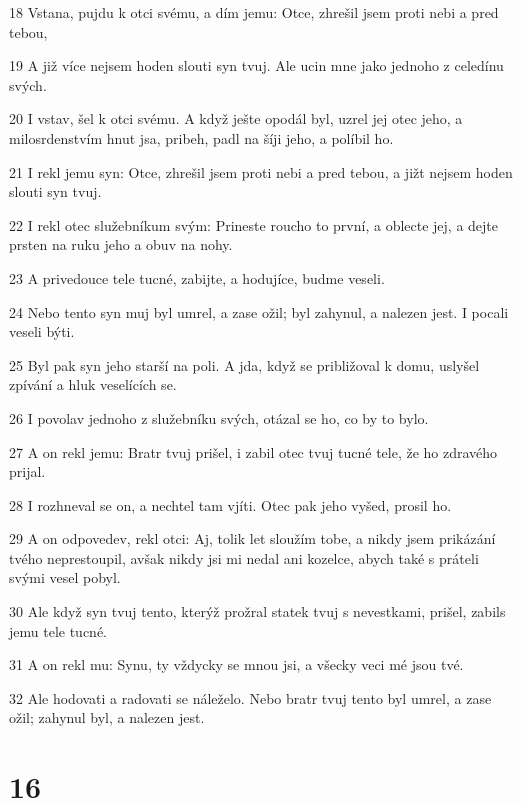 \par 18 Vstana, pujdu k otci svému, a dím jemu: Otce, zhrešil jsem proti nebi a pred tebou,
\par 19 A již více nejsem hoden slouti syn tvuj. Ale ucin mne jako jednoho z celedínu svých.
\par 20 I vstav, šel k otci svému. A když ješte opodál byl, uzrel jej otec jeho, a milosrdenstvím hnut jsa, pribeh, padl na šíji jeho, a políbil ho.
\par 21 I rekl jemu syn: Otce, zhrešil jsem proti nebi a pred tebou, a jižt nejsem hoden slouti syn tvuj.
\par 22 I rekl otec služebníkum svým: Prineste roucho to první, a oblecte jej, a dejte prsten na ruku jeho a obuv na nohy.
\par 23 A privedouce tele tucné, zabijte, a hodujíce, budme veseli.
\par 24 Nebo tento syn muj byl umrel, a zase ožil; byl zahynul, a nalezen jest. I pocali veseli býti.
\par 25 Byl pak syn jeho starší na poli. A jda, když se približoval k domu, uslyšel zpívání a hluk veselících se.
\par 26 I povolav jednoho z služebníku svých, otázal se ho, co by to bylo.
\par 27 A on rekl jemu: Bratr tvuj prišel, i zabil otec tvuj tucné tele, že ho zdravého prijal.
\par 28 I rozhneval se on, a nechtel tam vjíti. Otec pak jeho vyšed, prosil ho.
\par 29 A on odpovedev, rekl otci: Aj, tolik let sloužím tobe, a nikdy jsem prikázání tvého neprestoupil, avšak nikdy jsi mi nedal ani kozelce, abych také s práteli svými vesel pobyl.
\par 30 Ale když syn tvuj tento, kterýž prožral statek tvuj s nevestkami, prišel, zabils jemu tele tucné.
\par 31 A on rekl mu: Synu, ty vždycky se mnou jsi, a všecky veci mé jsou tvé.
\par 32 Ale hodovati a radovati se náleželo. Nebo bratr tvuj tento byl umrel, a zase ožil; zahynul byl, a nalezen jest.

\chapter{16}

